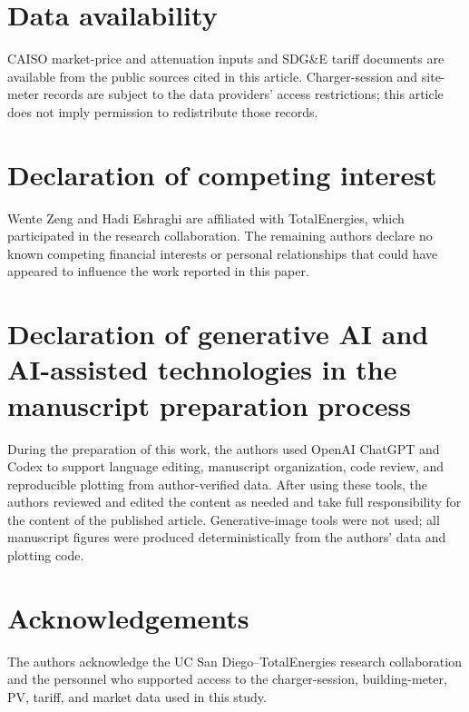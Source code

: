 \documentclass[final,5p,times]{elsarticle}
\begin{document}
\section*{Data availability}
CAISO market-price and attenuation inputs and SDG\&E tariff documents are
available from the public sources cited in this article. Charger-session and
site-meter records are subject to the data providers' access restrictions;
this article does not imply permission to redistribute those records.

\section*{Declaration of competing interest}
Wente Zeng and Hadi Eshraghi are affiliated with TotalEnergies, which
participated in the research collaboration. The remaining authors declare no
known competing financial interests or personal relationships that could have
appeared to influence the work reported in this paper.

\section*{Declaration of generative AI and AI-assisted technologies in the manuscript preparation process}
During the preparation of this work, the authors used OpenAI ChatGPT and Codex
to support language editing, manuscript organization, code review, and
reproducible plotting from author-verified data. After using these tools, the
authors reviewed and edited the content as needed and take full responsibility
for the content of the published article. Generative-image tools were not used;
all manuscript figures were produced deterministically from the authors' data
and plotting code.

\section*{Acknowledgements}
The authors acknowledge the UC San Diego--TotalEnergies research collaboration
and the personnel who supported access to the charger-session, building-meter,
PV, tariff, and market data used in this study.

\clearpage


\end{document}
